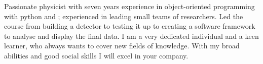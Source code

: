 Passionate physicist with seven years experience in object-oriented programming with python and \cpp; experienced in leading small teams of researchers.
Led the course from building a detector to testing it up to creating a software framework to analyse and display the final data.
I am a very dedicated individual and a keen learner, who always wants to cover new fields of knowledge.
With my broad abilities and good social skills I will excel in your company.\par

